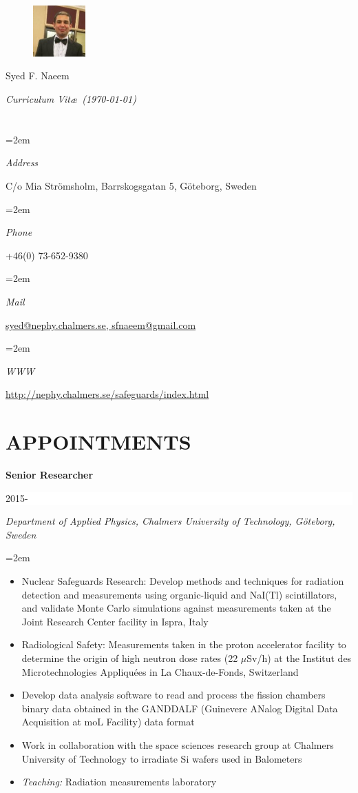 \documentclass[paper=letter,fontsize=11pt]{scrartcl} %
\newlength{\spacebox}
\newcommand{\sepspace}{\vspace*{1em}}		%
\newcommand{\MyName}[1]{ %
		\Huge \usefont{OT1}{phv}{b}{n} \hfill #1
		\par \normalsize \normalfont}
\newcommand{\MySlogan}[1]{ %
		\large \usefont{OT1}{phv}{m}{n}\hfill \textit{#1}
		\par \normalsize \normalfont}
\newcommand{\NewPart}[2]{\section*{\uppercase{#1} #2}}
\newcommand{\PersonalEntry}[2]{
		\noindent\hangindent=2em\hangafter=0 %
		\parbox{\spacebox}{        %
		\textit{#1}}		       %
		\hspace{1.5em} #2 \par}    %
\newcommand{\EducationEntry}[4]{
		\noindent \textbf{#1} \hfill      %
		\colorbox{White}{%
			\parbox{6em}{%
			\hfill\color{Black}#2}} \par  %
		\noindent \textit{#3} \par        %
		\noindent\hangindent=2em\hangafter=0 \small #4 %
		\normalsize \par}
\begin{document}

\begin{figure}
	\vspace*{-2em}
		\includegraphics[width=0.18\textwidth]{Fahad.jpg}
\end{figure}

\MyName{Syed F. Naeem}
\MySlogan{Curriculum Vit\ae\ (\today)}

\sepspace

\NewPart{}{}

\PersonalEntry{Address}{C/o Mia Strömsholm, Barrskogsgatan 5, Göteborg, Sweden}
\PersonalEntry{Phone}{+46(0) 73-652-9380}
\PersonalEntry{Mail}{\href{mailto:syed@nephy.chalmers.se, sfnaeem@gmail.com}{syed@nephy.chalmers.se, sfnaeem@gmail.com}}
\PersonalEntry{WWW}{\href{http://nephy.chalmers.se/safeguards/index.html}{http://nephy.chalmers.se/safeguards/index.html}}


\NewPart{Appointments}{}


\EducationEntry{Senior Researcher}{2015-$\qquad$}{Department of Applied Physics, Chalmers University of Technology, Göteborg, Sweden}{\begin{itemize}
\item{Nuclear Safeguards Research: Develop methods and techniques for radiation detection and measurements using organic-liquid and NaI(Tl) scintillators, and validate Monte Carlo simulations against measurements taken at the Joint Research Center facility in Ispra, Italy}
\item{Radiological Safety: Measurements taken in the proton accelerator facility to determine the origin of high neutron dose rates (22 \(\mu\)Sv/h) at the Institut des Microtechnologies Appliquées in La Chaux-de-Fonds, Switzerland}
\item{Develop data analysis software to read and process the fission chambers binary data obtained in the GANDDALF (Guinevere ANalog Digital Data Acquisition at moL Facility) data format}
\item{Work in collaboration with the space sciences research group at Chalmers University of Technology to irradiate Si wafers used in Balometers}
\item{\textit{Teaching:} Radiation measurements laboratory}\end{itemize}}
\sepspace
\end{document}
